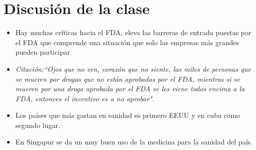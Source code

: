 \section{Discusión de la clase}
\begin{itemize}
    \item Hay muchas críticas hacia el FDA, eleva las barreras de entrada puestas por el FDA que comprende una situación que solo las empresas más grandes pueden participar 
    \item \emph{Citación:``Ojos que no ven, corazón que no siente, las miles de personas que se mueren por drogas que no están aprobadas por el FDA, mientras si se mueren por una droga aprobada por el FDA se les viene todos encima a la FDA, entonces el incentivo es a no aprobar"}.
    \item Los países que más gastan en sanidad es primero EEUU y en cuba como segundo lugar.
    \item En Singapur se da un muy buen uso de la medicina para la sanidad del país.
\end{itemize}


